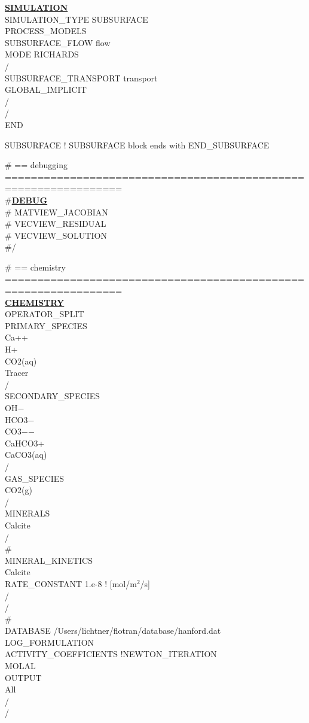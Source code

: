 \noindent
\hyperlink{target_simulation}{\bf SIMULATION}\\
  SIMULATION\_TYPE SUBSURFACE\\
  PROCESS\_MODELS\\
    SUBSURFACE\_FLOW flow\\
      MODE RICHARDS\\
    /\\
    SUBSURFACE\_TRANSPORT transport\\
      GLOBAL\_IMPLICIT\\
    /\\
  /\\
END

\noindent
SUBSURFACE ! SUBSURFACE block ends with END\_SUBSURFACE

\noindent
\# == debugging ================================================================\\
\#\hyperlink{target_dbg}{\bf DEBUG}\\
\#  MATVIEW\_JACOBIAN\\
\#  VECVIEW\_RESIDUAL\\
\#  VECVIEW\_SOLUTION\\
\#/

\noindent
\# == chemistry ================================================================\\
\hyperlink{target_chem}{\bf CHEMISTRY}\\
OPERATOR\_SPLIT\\
PRIMARY\_SPECIES\\
  Ca++\\
  H+\\
  CO2(aq)\\
  Tracer\\
/\\
SECONDARY\_SPECIES\\
  OH$-$\\
  HCO3$-$\\
  CO3$-$$-$\\
  CaHCO3+\\
  CaCO3(aq)\\
/\\
GAS\_SPECIES\\
  CO2(g)\\
/\\
MINERALS\\
  Calcite\\
/\\
\#\\
MINERAL\_KINETICS\\
Calcite\\
RATE\_CONSTANT 1.e-8 ! [mol/m$^2$/s]\\
/\\
/\\
\#\\
DATABASE /Users/lichtner/flotran/database/hanford.dat\\
LOG\_FORMULATION\\
ACTIVITY\_COEFFICIENTS !NEWTON\_ITERATION\\
MOLAL\\
OUTPUT\\
All\\
/\\
/

